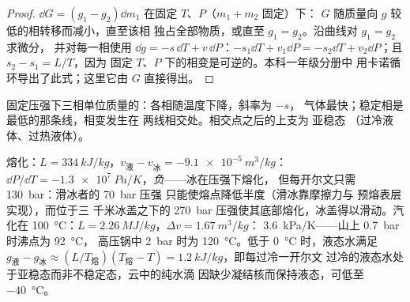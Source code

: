 \begin{proof}
$\dd G = (g_1 - g_2)\dd m_1$ 在固定 $T$、$P$（$m_1 + m_2$ 固定）下：
$G$ 随质量向 $g$ 较低的相转移而减小，直至该相
独占全部物质，或直至 $g_1 = g_2$。沿曲线对 $g_1 = g_2$ 求微分，
并对每一相使用 $\dd g = -s\,\dd T + v\,\dd P$：$-s_1\dd T +
v_1\dd P = -s_2\dd T + v_2\dd P$；且 $s_2 - s_1 = L/T$，因为
固定 $T$、$P$ 下的相变是可逆的。本科一年级分册中
用卡诺循环导出了此式；这里它由 $G$ 直接得出。
\end{proof}

\begin{omfigure}

{\small 固定压强下三相单位质量的：各相随温度下降，斜率为 $-s$，
气体最快；稳定相是最低的那条线，相变发生在
两线相交处。相交点之后的上支为
亚稳态
（过冷液体、过热液体）。}
\end{omfigure}

\begin{example}[水：斜率与亚稳态]\label{ex:b2:thermodynamic-potentials:water}
熔化：$L = \qty{334}{kJ/kg}$，$v_{\text{液}} - v_{\text{冰}} = -\qty{9.1e-5}{m^3/kg}$：
$\dd P/\dd T = \qty{-1.3e7}{Pa/K}$，\emph{负}——冰在压强下熔化，
但每开尔文只需 \qty{130}{bar}：滑冰者的 \qty{70}{bar} 压强
只能使熔点降低半度（滑冰靠摩擦力与
预熔表层实现），而位于三
千米冰盖之下的 \qty{270}{bar} 压强使其底部熔化，冰盖得以滑动。汽化在
\qty{100}{\celsius}：$L = \qty{2.26}{MJ/kg}$，$\Delta v = \qty{1.67}{m^3/kg}$：
\qty{3.6}{kPa/K}——山上 \qty{0.7}{bar} 时沸点为 \qty{92}{\celsius}，
高压锅中 \qty{2}{bar} 时为 \qty{120}{\celsius}。低于
\qty{0}{\celsius} 时，液态水满足 $g_{\text{液}} - g_{\text{冰}} \approx
(L/T_{\text{熔}})(T_{\text{熔}} - T) = \qty{1.2}{kJ/kg}$，即每过冷一开尔文
过冷的液态水处于亚稳态而非不稳定态，云中的纯水滴
因缺少凝结核而保持液态，可低至 \qty{-40}{\celsius}。
\end{example}


